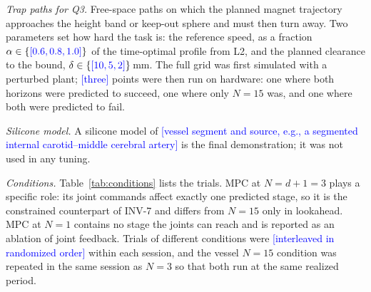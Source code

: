 \documentclass[journal]{IEEEtran}
\newcommand{\NEWRUN}[1]{\textcolor{blue}{[#1]}}
\begin{document}
\emph{Trap paths for Q3.} Free-space paths on which the planned magnet
trajectory approaches the height band or keep-out sphere and must then
turn away. Two parameters set how hard the task is: the reference speed,
as a fraction $\alpha\in\{\NEWRUN{0.6, 0.8, 1.0}\}$ of the time-optimal
profile from L2, and the planned clearance to the bound,
$\delta\in\{\NEWRUN{10, 5, 2}\}$\,mm. The full grid was first simulated
with a perturbed plant; \NEWRUN{three} points were then run on hardware: one
where both horizons were predicted to succeed, one where only $N=15$
was, and one where both were predicted to fail.

\emph{Silicone model.} A silicone model of \NEWRUN{vessel segment and
source, e.g., a segmented internal carotid--middle cerebral artery} is
the final demonstration; it was not used in any tuning.

\emph{Conditions.} Table~\ref{tab:conditions} lists the trials. MPC at
$N=d+1=3$ plays a specific role: its joint commands affect exactly one
predicted stage, so it is the constrained counterpart of INV-7 and differs
from $N=15$ only in lookahead. MPC at $N=1$ contains no stage the joints
can reach and is reported as an ablation of joint feedback. Trials of
different conditions were \NEWRUN{interleaved in randomized order} within
each session, and the vessel $N=15$ condition was repeated in the same
session as $N=3$ so that both run at the same realized period.
\end{document}
